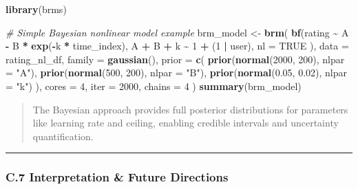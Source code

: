 \documentclass[
]{article}
\newenvironment{Shaded}{\begin{snugshade}}{\end{snugshade}}
\newcommand{\AttributeTok}[1]{\textcolor[rgb]{0.13,0.29,0.53}{#1}}
\newcommand{\CommentTok}[1]{\textcolor[rgb]{0.56,0.35,0.01}{\textit{#1}}}
\newcommand{\ConstantTok}[1]{\textcolor[rgb]{0.56,0.35,0.01}{#1}}
\newcommand{\DecValTok}[1]{\textcolor[rgb]{0.00,0.00,0.81}{#1}}
\newcommand{\FloatTok}[1]{\textcolor[rgb]{0.00,0.00,0.81}{#1}}
\newcommand{\FunctionTok}[1]{\textcolor[rgb]{0.13,0.29,0.53}{\textbf{#1}}}
\newcommand{\NormalTok}[1]{#1}
\newcommand{\OtherTok}[1]{\textcolor[rgb]{0.56,0.35,0.01}{#1}}
\newcommand{\SpecialCharTok}[1]{\textcolor[rgb]{0.81,0.36,0.00}{\textbf{#1}}}
\newcommand{\StringTok}[1]{\textcolor[rgb]{0.31,0.60,0.02}{#1}}
\begin{document}
\begin{Shaded}
\begin{Highlighting}[]
\FunctionTok{library}\NormalTok{(brms)}

\CommentTok{\# Simple Bayesian nonlinear model example}
\NormalTok{brm\_model }\OtherTok{\textless{}{-}} \FunctionTok{brm}\NormalTok{(}
  \FunctionTok{bf}\NormalTok{(rating }\SpecialCharTok{\textasciitilde{}}\NormalTok{ A }\SpecialCharTok{{-}}\NormalTok{ B }\SpecialCharTok{*} \FunctionTok{exp}\NormalTok{(}\SpecialCharTok{{-}}\NormalTok{k }\SpecialCharTok{*}\NormalTok{ time\_index),}
\NormalTok{    A }\SpecialCharTok{+}\NormalTok{ B }\SpecialCharTok{+}\NormalTok{ k }\SpecialCharTok{\textasciitilde{}} \DecValTok{1} \SpecialCharTok{+}\NormalTok{ (}\DecValTok{1} \SpecialCharTok{|}\NormalTok{ user),}
    \AttributeTok{nl =} \ConstantTok{TRUE}
\NormalTok{  ),}
  \AttributeTok{data =}\NormalTok{ rating\_nl\_df,}
  \AttributeTok{family =} \FunctionTok{gaussian}\NormalTok{(),}
  \AttributeTok{prior =} \FunctionTok{c}\NormalTok{(}
    \FunctionTok{prior}\NormalTok{(}\FunctionTok{normal}\NormalTok{(}\DecValTok{2000}\NormalTok{, }\DecValTok{200}\NormalTok{), }\AttributeTok{nlpar =} \StringTok{"A"}\NormalTok{),}
    \FunctionTok{prior}\NormalTok{(}\FunctionTok{normal}\NormalTok{(}\DecValTok{500}\NormalTok{, }\DecValTok{200}\NormalTok{), }\AttributeTok{nlpar =} \StringTok{"B"}\NormalTok{),}
    \FunctionTok{prior}\NormalTok{(}\FunctionTok{normal}\NormalTok{(}\FloatTok{0.05}\NormalTok{, }\FloatTok{0.02}\NormalTok{), }\AttributeTok{nlpar =} \StringTok{"k"}\NormalTok{)}
\NormalTok{  ),}
  \AttributeTok{cores =} \DecValTok{4}\NormalTok{, }\AttributeTok{iter =} \DecValTok{2000}\NormalTok{, }\AttributeTok{chains =} \DecValTok{4}
\NormalTok{)}
\FunctionTok{summary}\NormalTok{(brm\_model)}
\end{Highlighting}
\end{Shaded}

\begin{quote}
The Bayesian approach provides full posterior distributions for
parameters like learning rate and ceiling, enabling credible intervals
and uncertainty quantification.
\end{quote}

\begin{center}\rule{0.5\linewidth}{0.5pt}\end{center}

\subsubsection{C.7 Interpretation \& Future
Directions}\label{c.7-interpretation-future-directions}
\end{document}
